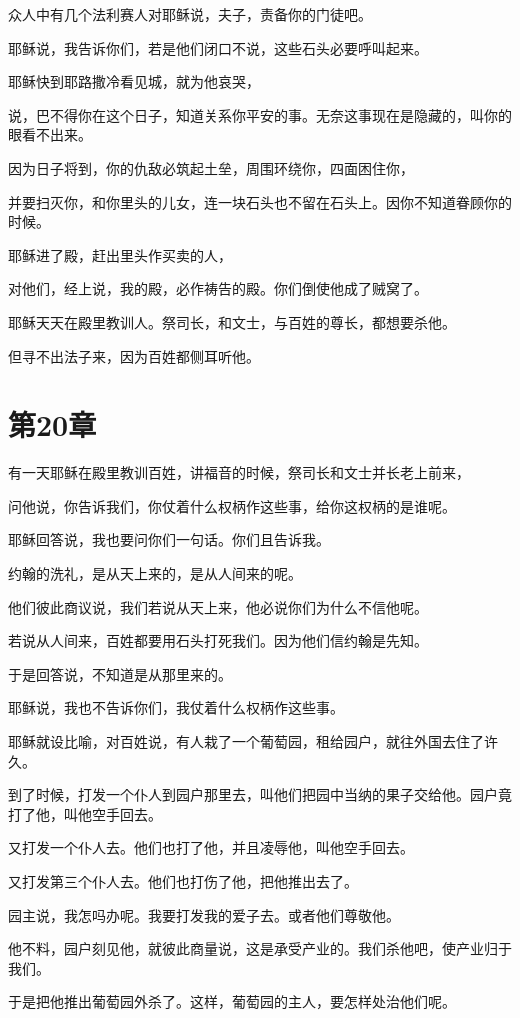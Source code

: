 \documentclass[12pt,oneside]{book}
\begin{document}
众人中有几个法利赛人对耶稣说，夫子，责备你的门徒吧。

耶稣说，我告诉你们，若是他们闭口不说，这些石头必要呼叫起来。

耶稣快到耶路撒冷看见城，就为他哀哭，

说，巴不得你在这个日子，知道关系你平安的事。无奈这事现在是隐藏的，叫你的眼看不出来。

因为日子将到，你的仇敌必筑起土垒，周围环绕你，四面困住你，

并要扫灭你，和你里头的儿女，连一块石头也不留在石头上。因你不知道眷顾你的时候。

耶稣进了殿，赶出里头作买卖的人，

对他们，经上说，我的殿，必作祷告的殿。你们倒使他成了贼窝了。

耶稣天天在殿里教训人。祭司长，和文士，与百姓的尊长，都想要杀他。

但寻不出法子来，因为百姓都侧耳听他。

\chapter{第20章}
有一天耶稣在殿里教训百姓，讲福音的时候，祭司长和文士并长老上前来，

问他说，你告诉我们，你仗着什么权柄作这些事，给你这权柄的是谁呢。

耶稣回答说，我也要问你们一句话。你们且告诉我。

约翰的洗礼，是从天上来的，是从人间来的呢。

他们彼此商议说，我们若说从天上来，他必说你们为什么不信他呢。

若说从人间来，百姓都要用石头打死我们。因为他们信约翰是先知。

于是回答说，不知道是从那里来的。

耶稣说，我也不告诉你们，我仗着什么权柄作这些事。

耶稣就设比喻，对百姓说，有人栽了一个葡萄园，租给园户，就往外国去住了许久。

到了时候，打发一个仆人到园户那里去，叫他们把园中当纳的果子交给他。园户竟打了他，叫他空手回去。

又打发一个仆人去。他们也打了他，并且凌辱他，叫他空手回去。

又打发第三个仆人去。他们也打伤了他，把他推出去了。

园主说，我怎吗办呢。我要打发我的爱子去。或者他们尊敬他。

他不料，园户刻见他，就彼此商量说，这是承受产业的。我们杀他吧，使产业归于我们。

于是把他推出葡萄园外杀了。这样，葡萄园的主人，要怎样处治他们呢。
\end{document}
